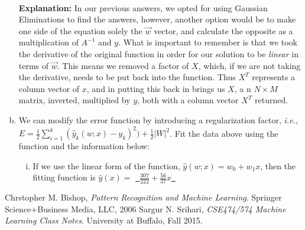 \documentclass[11pt]{article} %
\begin{document}
\begin{enumerate}[(a)]
~\\
{\bf Explanation: } In our previous answers, we opted for using Gaussian Eliminations to find the answers, however, another option would be to make one side of the equation solely the $\vec{w}$ vector, and calculate the opposite as a multiplication of $A^{-1}$ and $y$. What is important to remember is that we took the derivative of the original function in order for our solution to be {\em linear} in terms of $\vec{w}$. This means we removed a factor of $X$, which, if we are not taking the derivative, needs to be put back into the function. Thus $X^T$ represents a column vector of $x$, and in putting this back in brings us $X$, a n $N \times M$ matrix, inverted, multiplied by $y$, both with a column vector $X^T$ returned.
\item We can modify the error function by introducing a regularization factor, {\em i.e.}, $E = \frac{1}{2} \sum_{i=1}^{k} (\hat{y}_k(w;x)-y_k)^2) + \frac{1}{2}|W|^2$. Fit the data above using the function and the information below:
\begin{enumerate}[i. ]
\item If we use the linear form of the function, $\hat{y}(w;x) = w_0 + w_1x$, then the fitting function is $\hat{y}(x) = $ \underline{~$\frac{307}{222} + \frac{56}{37}x$~}
\end{enumerate}
\end{enumerate}

\begin{thebibliography}{9}
Chrstopher M. Bishop,
{\em Pattern Recognition and Machine Learning}.
Springer Science+Business Media, LLC,
2006
Sargur N. Srihari,
{\em CSE474/574 Machine Learning Class Notes}.
University at Buffalo,
Fall 2015.
\end{thebibliography}
\end{document}

